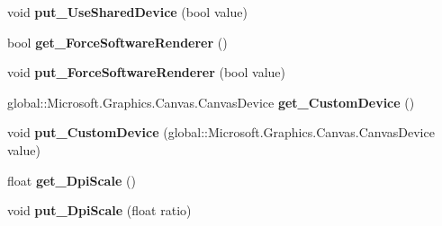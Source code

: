 \begin{DoxyCompactItemize}
void {\bfseries put\+\_\+\+Use\+Shared\+Device} (bool value)
\item 
\mbox{\label{interface_microsoft_1_1_graphics_1_1_canvas_1_1_u_i_1_1_xaml_1_1_i_canvas_control_a62be2aa017fd1aa2d0100789a5dbd557}} 
bool {\bfseries get\+\_\+\+Force\+Software\+Renderer} ()
\item 
\mbox{\label{interface_microsoft_1_1_graphics_1_1_canvas_1_1_u_i_1_1_xaml_1_1_i_canvas_control_adb46fbfbe0e98392df3ff1ebdbfe650d}} 
void {\bfseries put\+\_\+\+Force\+Software\+Renderer} (bool value)
\item 
\mbox{\label{interface_microsoft_1_1_graphics_1_1_canvas_1_1_u_i_1_1_xaml_1_1_i_canvas_control_a662ab7bd653827c7b276b057e9eab211}} 
global\+::\+Microsoft.\+Graphics.\+Canvas.\+Canvas\+Device {\bfseries get\+\_\+\+Custom\+Device} ()
\item 
\mbox{\label{interface_microsoft_1_1_graphics_1_1_canvas_1_1_u_i_1_1_xaml_1_1_i_canvas_control_a4da1f97d13f825f768730d9598d88902}} 
void {\bfseries put\+\_\+\+Custom\+Device} (global\+::\+Microsoft.\+Graphics.\+Canvas.\+Canvas\+Device value)
\item 
\mbox{\label{interface_microsoft_1_1_graphics_1_1_canvas_1_1_u_i_1_1_xaml_1_1_i_canvas_control_aa82b042e077fa0bf256753af653fd201}} 
float {\bfseries get\+\_\+\+Dpi\+Scale} ()
\item 
\mbox{\label{interface_microsoft_1_1_graphics_1_1_canvas_1_1_u_i_1_1_xaml_1_1_i_canvas_control_a6e1d54ce91aed2c4bb4394e089748342}} 
void {\bfseries put\+\_\+\+Dpi\+Scale} (float ratio)
\item 
\mbox{\label{interface_microsoft_1_1_graphics_1_1_canvas_1_1_u_i_1_1_xaml_1_1_i_canvas_control_a8a6d5efad4792d05ccdb1542d9522d15}} 

\end{DoxyCompactItemize}
